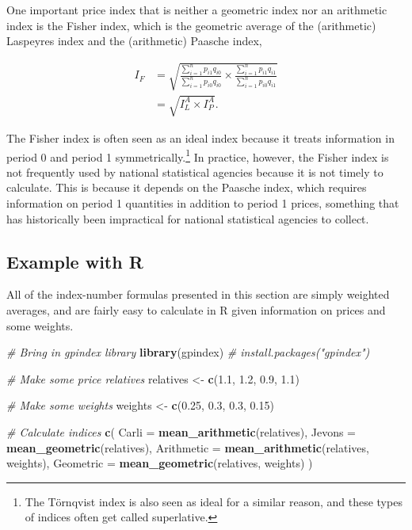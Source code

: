 \documentclass[]{article}
\newenvironment{Shaded}{\begin{snugshade}}{\end{snugshade}}
\newcommand{\CommentTok}[1]{\textcolor[rgb]{0.56,0.35,0.01}{\textit{#1}}}
\newcommand{\DataTypeTok}[1]{\textcolor[rgb]{0.13,0.29,0.53}{#1}}
\newcommand{\FloatTok}[1]{\textcolor[rgb]{0.00,0.00,0.81}{#1}}
\newcommand{\KeywordTok}[1]{\textcolor[rgb]{0.13,0.29,0.53}{\textbf{#1}}}
\newcommand{\NormalTok}[1]{#1}
\newcommand{\StringTok}[1]{\textcolor[rgb]{0.31,0.60,0.02}{#1}}
\begin{document}
One important price index that is neither a geometric index nor an arithmetic index is the Fisher index, which is the geometric average of the (arithmetic) Laspeyres index and the (arithmetic) Paasche index,

\begin{align*}
I_{F} &= \sqrt{\frac{\sum_{i = 1}^{n} p_{i1} q_{i0}}{\sum_{i = 1}^{n} p_{i0} q_{i0}} \times \frac{\sum_{i = 1}^{n} p_{i1} q_{i1}}{\sum_{i = 1}^{n} p_{i0} q_{i1}}} \\
&= \sqrt{I^{A}_{L} \times I^{A}_{P}}.
\end{align*}

The Fisher index is often seen as an ideal index because it treats information in period 0 and period 1 symmetrically.\footnote{The Törnqvist index is also seen as ideal for a similar reason, and these types of indices often get called superlative.} In practice, however, the Fisher index is not frequently used by national statistical agencies because it is not timely to calculate. This is because it depends on the Paasche index, which requires information on period 1 quantities in addition to period 1 prices, something that has historically been impractical for national statistical agencies to collect.

\hypertarget{example-with-r}{%
\subsection{Example with R}\label{example-with-r}}

All of the index-number formulas presented in this section are simply weighted averages, and are fairly easy to calculate in R given information on prices and some weights.

\begin{Shaded}
\begin{Highlighting}[]
\CommentTok{# Bring in gpindex library}
\KeywordTok{library}\NormalTok{(gpindex) }\CommentTok{# install.packages("gpindex")}

\CommentTok{# Make some price relatives}
\NormalTok{relatives <-}\StringTok{ }\KeywordTok{c}\NormalTok{(}\FloatTok{1.1}\NormalTok{, }\FloatTok{1.2}\NormalTok{, }\FloatTok{0.9}\NormalTok{, }\FloatTok{1.1}\NormalTok{)}

\CommentTok{# Make some weights}
\NormalTok{weights <-}\StringTok{ }\KeywordTok{c}\NormalTok{(}\FloatTok{0.25}\NormalTok{, }\FloatTok{0.3}\NormalTok{, }\FloatTok{0.3}\NormalTok{, }\FloatTok{0.15}\NormalTok{)}

\CommentTok{# Calculate indices}
\KeywordTok{c}\NormalTok{(}
  \DataTypeTok{Carli =} \KeywordTok{mean_arithmetic}\NormalTok{(relatives), }
  \DataTypeTok{Jevons =} \KeywordTok{mean_geometric}\NormalTok{(relatives), }
  \DataTypeTok{Arithmetic =} \KeywordTok{mean_arithmetic}\NormalTok{(relatives, weights),}
  \DataTypeTok{Geometric =} \KeywordTok{mean_geometric}\NormalTok{(relatives, weights)}
\NormalTok{)}
\end{Highlighting}
\end{Shaded}
\end{document}

